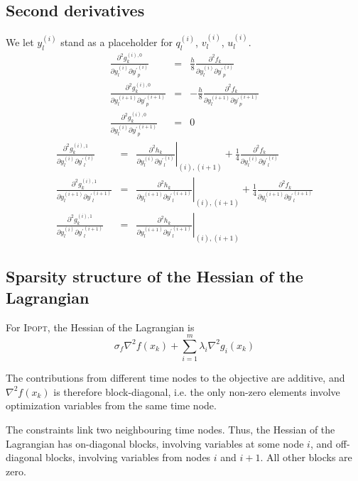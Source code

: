 \documentclass[a4paper]{article}
\begin{document}
\subsection{Second derivatives}
We let $y_l^{(i)}$ stand as a placeholder for $q_l^{(i)}$, $v_l^{(i)}$, $u_l^{(i)}$.
\begin{eqnarray}
\frac{\partial^2 g_k^{(i),0}}{\partial y_l^{(i)} \partial {y^\prime}_p^{(i)}} &=&
\frac{h}{8} \frac{\partial^2 f_k}{\partial y_l^{(i)} \partial {y^\prime}_p^{(i)}}\\
\frac{\partial^2 g_k^{(i),0}}{\partial y_l^{(i+1)} \partial {y^\prime}_p^{(i+1)}} &=&
-\frac{h}{8} \frac{\partial^2 f_k}{\partial y_l^{(i+1)} \partial {y^\prime}_p^{(i+1)}}\\
\frac{\partial^2 g_k^{(i),0}}{\partial y_l^{(i)} \partial {y^\prime}_p^{(i+1)}} &=& 0
\end{eqnarray}
\begin{eqnarray}
\frac{\partial^2 g_k^{(i),1}}{\partial y_l^{(i)} \partial {y^\prime}_l^{(i)}} &=&
\left. \frac{\partial^2 h_k}{\partial y_l^{(i)} \partial {y^\prime}_l^{(i)}} \right|_{(i), (i+1)} +
\frac{1}{4} \frac{\partial^2 f_k}{\partial y_l^{(i)} \partial {y^\prime}_l^{(i)}}\\
\frac{\partial^2 g_k^{(i),1}}{\partial y_l^{(i+1)} \partial {y^\prime}_l^{(i+1)}} &=&
\left. \frac{\partial^2 h_k}{\partial y_l^{(i+1)} \partial {y^\prime}_l^{(i+1)}} \right|_{(i), (i+1)} +
\frac{1}{4} \frac{\partial^2 f_k}{\partial y_l^{(i+1)} \partial {y^\prime}_l^{(i+1)}}\\
\frac{\partial^2 g_k^{(i),1}}{\partial y_l^{(i)} \partial {y^\prime}_l^{(i+1)}} &=&
\left. \frac{\partial^2 h_k}{\partial y_l^{(i+1)} \partial {y^\prime}_l^{(i+1)}} \right|_{(i), (i+1)}
\end{eqnarray}

\subsection{Sparsity structure of the Hessian of the Lagrangian}
For \textsc{Ipopt}, the Hessian of the Lagrangian is
\begin{equation}
\sigma_f \nabla^2 f(x_k) + \sum_{i=1}^{m} \lambda_i \nabla^2 g_i(x_k)
\end{equation}

The contributions from different time nodes to the objective are additive, and $\nabla^2 f(x_k)$ is therefore block-diagonal, i.e. the only non-zero elements involve optimization variables from the same time node.

The constraints link two neighbouring time nodes. Thus, the Hessian of the Lagrangian has on-diagonal blocks, involving variables at some node $i$, and off-diagonal blocks, involving variables from nodes $i$ and $i+1$. All other blocks are zero.
\end{document}
